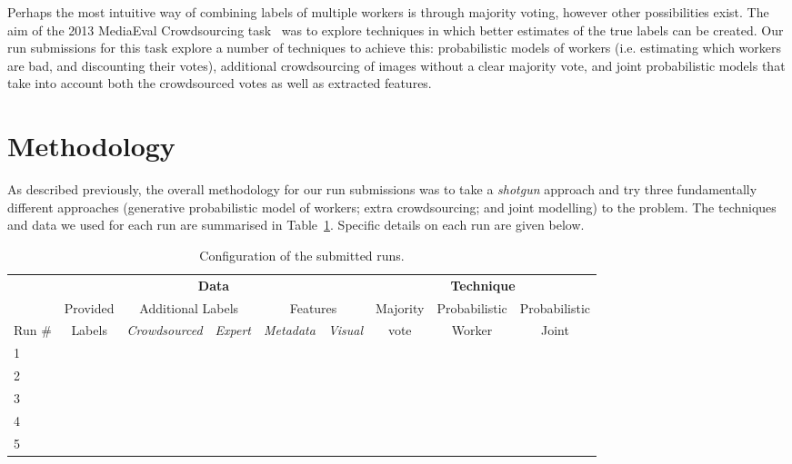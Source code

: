 \documentclass{../acm_proc_article-me11_tweaked}
\begin{document}
Perhaps the most intuitive way of combining labels of multiple workers is through majority voting, however other possibilities exist. The aim of the 2013 MediaEval Crowdsourcing task~\cite{CS2013} was to explore techniques in which better estimates of the true labels can be created. Our run submissions for this task explore a number of techniques to achieve this: probabilistic models of workers (i.e. estimating which workers are bad, and discounting their votes), additional crowdsourcing of images without a clear majority vote, and joint probabilistic models that take into account both the crowdsourced votes as well as extracted features.
	
\section{Methodology}
As described previously, the overall methodology for our run submissions was to take a \emph{shotgun} approach and try three fundamentally different approaches (generative probabilistic model of workers; extra crowdsourcing; and joint modelling) to the problem. The techniques and data we used for each run are summarised in Table~\ref{tab:config}. Specific details on each run are given below.

\begin{table}[t]
	\small
	\centering
	\caption{\label{tab:config}Configuration of the submitted runs.}
	\begin{tabular}{|l||c|c|c|c|c||c|c|c|}
		\hline	
		& \multicolumn{5}{c||}{\textbf{Data}} & \multicolumn{3}{c|}{\textbf{Technique}}\\
		\cline{2-9}
	& Provided & \multicolumn{2}{c|}{Additional Labels} & \multicolumn{2}{c||}{Features} & Majority & Probabilistic & Probabilistic\\
	\cline{3-6}
	Run \# & Labels & \emph{Crowdsourced} & \emph{Expert} & \emph{Metadata} & \emph{Visual} & vote & Worker & Joint\\
	
	\hline\hline
	1 & \checkmark & & & & & & \checkmark & \\ \hline
	2 & \checkmark & \checkmark & \checkmark & & & \checkmark & & \\ \hline
	3 & \checkmark & \checkmark & \checkmark & & & & \checkmark & \\ \hline
	4 & \checkmark & \checkmark & \checkmark & \checkmark & & & & \checkmark \\ \hline
	5 & \checkmark & \checkmark & \checkmark & \checkmark & \checkmark & & &\checkmark \\ \hline
	\end{tabular}
\end{table}
\end{document}
